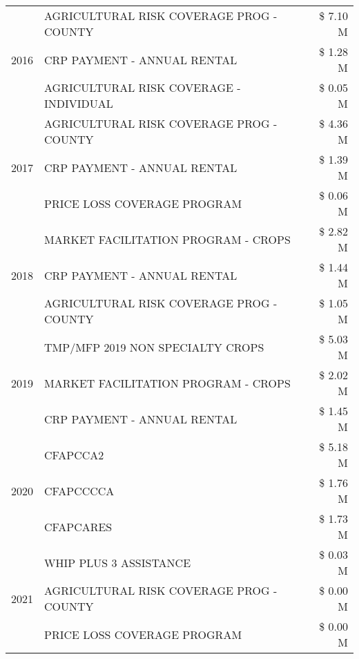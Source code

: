 \begin{tabular}{llr}
\cline{1-3}
\multirow[t]{3}{*}{2016} & AGRICULTURAL RISK COVERAGE PROG - COUNTY      & \$ 7.10 M \\
 & CRP PAYMENT - ANNUAL RENTAL                   & \$ 1.28 M \\
 & AGRICULTURAL RISK COVERAGE - INDIVIDUAL       & \$ 0.05 M \\
\cline{1-3}
\multirow[t]{3}{*}{2017} & AGRICULTURAL RISK COVERAGE PROG - COUNTY & \$ 4.36 M \\
 & CRP PAYMENT - ANNUAL RENTAL & \$ 1.39 M \\
 & PRICE LOSS COVERAGE PROGRAM & \$ 0.06 M \\
\cline{1-3}
\multirow[t]{3}{*}{2018} & MARKET FACILITATION PROGRAM - CROPS & \$ 2.82 M \\
 & CRP PAYMENT - ANNUAL RENTAL & \$ 1.44 M \\
 & AGRICULTURAL RISK COVERAGE PROG - COUNTY & \$ 1.05 M \\
\cline{1-3}
\multirow[t]{3}{*}{2019} & TMP/MFP 2019 NON SPECIALTY CROPS & \$ 5.03 M \\
 & MARKET FACILITATION PROGRAM - CROPS & \$ 2.02 M \\
 & CRP PAYMENT - ANNUAL RENTAL & \$ 1.45 M \\
\cline{1-3}
\multirow[t]{3}{*}{2020} & CFAPCCA2 & \$ 5.18 M \\
 & CFAPCCCCA & \$ 1.76 M \\
 & CFAPCARES & \$ 1.73 M \\
\cline{1-3}
\multirow[t]{3}{*}{2021} & WHIP PLUS 3 ASSISTANCE & \$ 0.03 M \\
 & AGRICULTURAL RISK COVERAGE PROG - COUNTY & \$ 0.00 M \\
 & PRICE LOSS COVERAGE PROGRAM & \$ 0.00 M \\
\cline{1-3}
\bottomrule
\end{tabular}
